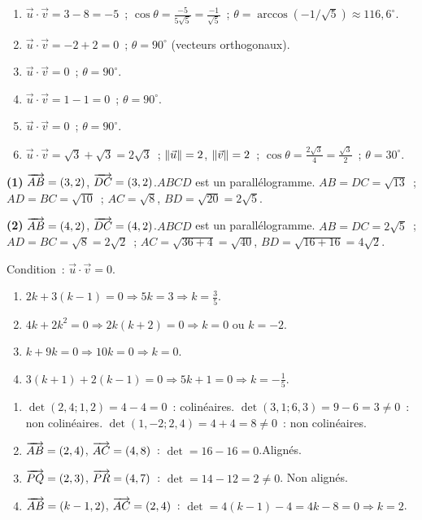 \begin{enumerate}
  \item $\vec{u}\cdot\vec{v}=3-8=-5$~; $\cos\theta=\frac{-5}{5\sqrt{5}}=\frac{-1}{\sqrt{5}}$~;
        $\theta=\arccos(-1/\sqrt{5})\approx116{,}6^{\circ}$.
  \item $\vec{u}\cdot\vec{v}=-2+2=0$~; $\theta=90^{\circ}$ (vecteurs orthogonaux).
  \item $\vec{u}\cdot\vec{v}=0$~; $\theta=90^{\circ}$.
  \item $\vec{u}\cdot\vec{v}=1-1=0$~; $\theta=90^{\circ}$.
  \item $\vec{u}\cdot\vec{v}=0$~; $\theta=90^{\circ}$.
  \item $\vec{u}\cdot\vec{v}=\sqrt{3}+\sqrt{3}=2\sqrt{3}$~;
        $\left\|\vec{u}\right\|=2$, $\left\|\vec{v}\right\|=2$~;
        $\cos\theta=\frac{2\sqrt{3}}{4}=\frac{\sqrt{3}}{2}$~; $\theta=30^{\circ}$.
\end{enumerate}


\textbf{(1)} $\overrightarrow{AB}=(3,2)$, $\overrightarrow{DC}=(3,2)$.\checkmark\quad $ABCD$ est un parall\'elogramme.
$AB=DC=\sqrt{13}$~; $AD=BC=\sqrt{10}$~; $AC=\sqrt{8}$, $BD=\sqrt{20}=2\sqrt{5}$.

\textbf{(2)} $\overrightarrow{AB}=(4,2)$, $\overrightarrow{DC}=(4,2)$.\checkmark\quad $ABCD$ est un parall\'elogramme.
$AB=DC=2\sqrt{5}$~; $AD=BC=\sqrt{8}=2\sqrt{2}$~; $AC=\sqrt{36+4}=\sqrt{40}$, $BD=\sqrt{16+16}=4\sqrt{2}$.


Condition~: $\vec{u}\cdot\vec{v}=0$.
\begin{enumerate}
  \item $2k+3(k-1)=0\Rightarrow5k=3\Rightarrow k=\tfrac{3}{5}$.
  \item $4k+2k^2=0\Rightarrow2k(k+2)=0\Rightarrow k=0$ ou $k=-2$.
  \item $k+9k=0\Rightarrow10k=0\Rightarrow k=0$.
  \item $3(k+1)+2(k-1)=0\Rightarrow5k+1=0\Rightarrow k=-\tfrac{1}{5}$.
\end{enumerate}


\begin{enumerate}
  \item $\det(2,4;1,2)=4-4=0$~: colin\'eaires.\checkmark\quad
        $\det(3,1;6,3)=9-6=3\ne0$~: non colin\'eaires.\quad
        $\det(1,-2;2,4)=4+4=8\ne0$~: non colin\'eaires.
  \item $\overrightarrow{AB}=(2,4)$, $\overrightarrow{AC}=(4,8)$~: $\det=16-16=0$.\checkmark\quad Align\'es.
  \item $\overrightarrow{PQ}=(2,3)$, $\overrightarrow{PR}=(4,7)$~: $\det=14-12=2\ne0$. Non align\'es.
  \item $\overrightarrow{AB}=(k-1,2)$, $\overrightarrow{AC}=(2,4)$~: $\det=4(k-1)-4=4k-8=0\Rightarrow k=2$.
\end{enumerate}

